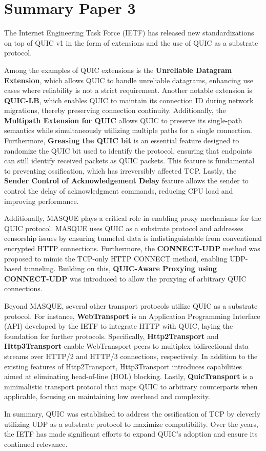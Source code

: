 \section{Summary Paper 3}%
\label{sec:Summary Paper 3}
The Internet Engineering Task Force (IETF) has released new standardizations on top of QUIC v1 in the form of extensions and the use of QUIC as a substrate protocol.

Among the examples of QUIC extensions is the \textbf{Unreliable Datagram Extension}, which allows QUIC to handle unreliable datagrams, enhancing use cases where reliability is not a strict requirement. 
Another notable extension is \textbf{QUIC-LB}, which enables QUIC to maintain its connection ID during network migrations, thereby preserving connection continuity. 
Additionally, the \textbf{Multipath Extension for QUIC} allows QUIC to preserve its single-path semantics while simultaneously utilizing multiple paths for a single connection. 
Furthermore, \textbf{Greasing the QUIC bit} is an essential feature designed to randomize the QUIC bit used to identify the protocol, ensuring that endpoints can still identify received packets as QUIC packets. 
This feature is fundamental to preventing ossification, which has irreversibly affected TCP. 
Lastly, the \textbf{Sender Control of Acknowledgement Delay} feature allows the sender to control the delay of acknowledgment commands, reducing CPU load and improving performance.

Additionally, MASQUE plays a critical role in enabling proxy mechanisms for the QUIC protocol. 
MASQUE uses QUIC as a substrate protocol and addresses censorship issues by ensuring tunneled data is indistinguishable from conventional encrypted HTTP connections. 
Furthermore, the \textbf{CONNECT-UDP} method was proposed to mimic the TCP-only HTTP CONNECT method, enabling UDP-based tunneling. 
Building on this, \textbf{QUIC-Aware Proxying using CONNECT-UDP} was introduced to allow the proxying of arbitrary QUIC connections.

Beyond MASQUE, several other transport protocols utilize QUIC as a substrate protocol. 
For instance, \textbf{WebTransport} is an Application Programming Interface (API) developed by the IETF to integrate HTTP with QUIC, laying the foundation for further protocols. 
Specifically, \textbf{Http2Transport} and \textbf{Http3Transport} enable WebTransport peers to multiplex bidirectional data streams over HTTP/2 and HTTP/3 connections, respectively. 
In addition to the existing features of Http2Transport, Http3Transport introduces capabilities aimed at eliminating head-of-line (HOL) blocking. 
Lastly, \textbf{QuicTransport} is a minimalistic transport protocol that maps QUIC to arbitrary counterparts when applicable, focusing on maintaining low overhead and complexity.

In summary, QUIC was established to address the ossification of TCP by cleverly utilizing UDP as a substrate protocol to maximize compatibility. 
Over the years, the IETF has made significant efforts to expand QUIC's adoption and ensure its continued relevance.


